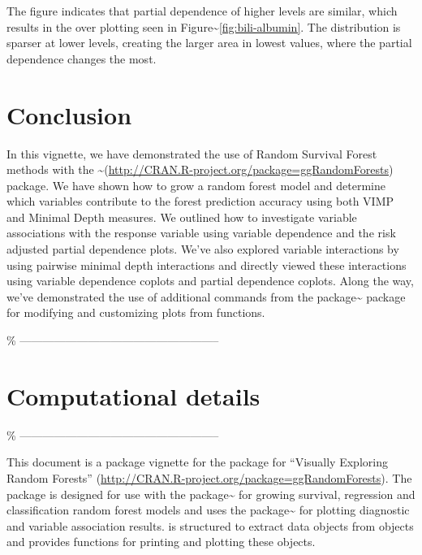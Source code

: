 \documentclass[article]{jss}
\begin{document}
The figure indicates that partial dependence of higher 
levels are similar, which results in the over plotting seen in
Figure\textasciitilde{}\ref{fig:bili-albumin}. The distribution is
sparser at lower  levels, creating the larger area in
lowest  values, where the partial dependence changes the
most.

\section{Conclusion}\label{S:conclusion}

In this vignette, we have demonstrated the use of Random Survival Forest
methods with the
\textasciitilde{}(\url{http://CRAN.R-project.org/package=ggRandomForests})
package. We have shown how to grow a random forest model and determine
which variables contribute to the forest prediction accuracy using both
VIMP and Minimal Depth measures. We outlined how to investigate variable
associations with the response variable using variable dependence and
the risk adjusted partial dependence plots. We've also explored variable
interactions by using pairwise minimal depth interactions and directly
viewed these interactions using variable dependence coplots and partial
dependence coplots. Along the way, we've demonstrated the use of
additional commands from the 
package\textasciitilde{}\citep[\url{http://CRAN.R-project.org/package=ggplot2}]{Wickham:2009}
package for modifying and customizing plots from 
functions.

\% -----------------------------------------------------
\section{Computational details} \%
-----------------------------------------------------

This document is a package vignette for the 
package for ``Visually Exploring Random Forests''
(\url{http://CRAN.R-project.org/package=ggRandomForests}). The
 package is designed for use with the
package\textasciitilde{}\citep[\url{http://CRAN.R-project.org/package=randomForestSRC}]{Ishwaran:RFSRC:2014}
for growing survival, regression and classification random forest models
and uses the 
package\textasciitilde{}\citep[\url{http://CRAN.R-project.org/package=ggplot2}]{Wickham:2009}
for plotting diagnostic and variable association results.
 is structured to extract data objects from
 objects and provides functions for printing and
plotting these objects.
\end{document}
